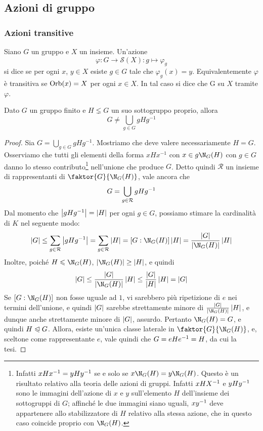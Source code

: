 \documentclass[11pt]{scrartcl}
\begin{document}
	\newpage
	
	\subsection{Azioni di gruppo}
	
	\subsubsection{Azioni transitive}
	
	\begin{definition}
		Siano $G$ un gruppo e $X$ un insieme. Un'azione \[
		\varphi:G \to \mathcal{S}(X) :g \mapsto \varphi_g
		\]si dice  se per ogni $x$, $y \in X$ esiste $g \in G$
		tale che $\varphi_g(x) = y$. Equivalentemente $\varphi$ è transitiva se
		$\operatorname{Orb}(x) = X$ per ogni 
		$x \in X$. In tal caso si dice che G  su $X$ 
		tramite $\varphi$.
	\end{definition}
	
	\begin{lemma}
		\label{lemma1.40}
		Dato $G$ un gruppo finito e $H \lneq G$ un suo sottogruppo proprio, allora \[
		G \neq \bigcup_{g \in G}gHg^{-1}
		\]
	\end{lemma}
	
	\begin{proof}
		Sia $G = \bigcup_{g \in G}gHg^{-1}$. Mostriamo che deve valere necessariamente
		$H = G$. Osserviamo che tutti gli
		elementi della forma $xHx^{-1}$ con $x \in g \N_G(H)$ con $g \in G$ danno
		lo stesso contributo\footnote{
			Infatti $xHx^{-1} = yHy^{-1}$ se e solo se $x \N_G(H) = y \N_G(H)$. Questo
			è un risultato relativo alla teoria delle azioni di gruppi. Infatti
			$xHX^{-1}$ e $yHy^{-1}$ sono le immagini dell'azione di $x$ e $y$ sull'elemento
			$H$ dell'insieme dei sottogruppi di $G$; affinché le due immagini siano uguali,
			$xy^{-1}$ deve appartenere allo stabilizzatore di $H$ relativo alla stessa
			azione, che in questo caso coincide proprio con $\N_G(H)$.
		} nell'unione che produce $G$. Detto quindi $\mathcal{R}$ un
		insieme di rappresentanti di $\faktor{G}{\N_G(H)}$, vale ancora che
		\[ G  = \bigcup_{g \in \mathcal{R}} gHg^{-1} \]
		Dal momento che $\left\lvert gHg^{-1} \right\rvert = \left\lvert H \right\rvert$ per ogni $g \in G$, possiamo
		stimare la cardinalità di $K$ nel seguente modo:
		\[ \abs{G} \leq \sum_{g \in \mathcal{R}} \abs{gHg\inv} = \sum_{g \in \mathcal{R}} \abs{H} = [G : \N_G(H)] \abs{H} = \frac{\abs{G}}{\abs{\N_G(H)}} \abs{H} \]
		Inoltre, poiché $H \leqslant \N_G(H)$, $\abs{\N_G(H)} \geq \abs{H}$, e quindi
		\[ \abs{G} \leq \frac{\abs{G}}{\abs{\N_G(H)}} \abs{H} \leq \frac{\abs{G}}{\abs{H}} \abs{H} = \abs{G} \]
		Se $[G : \N_G(H)]$ non fosse uguale ad $1$, vi sarebbero più ripetizione di $e$
		nei termini dell'unione, e quindi $\left\lvert G \right\rvert$ sarebbe strettamente minore di
		$\frac{\abs{G}}{\abs{\N_G(H)}} \abs{H}$, e dunque anche strettamente minore
		di $\left\lvert G \right\rvert$, assurdo. Pertanto
		$\N_G(H) = G$, e quindi $H \trianglelefteqslant G$. Allora, esiste un'unica
		classe laterale in $\faktor{G}{\N_G(H)}$, e, sceltone come rappresentante $e$,
		vale quindi che $G = eHe^{-1} = H$, da cui la tesi.
	\end{proof}
	
\end{document}
